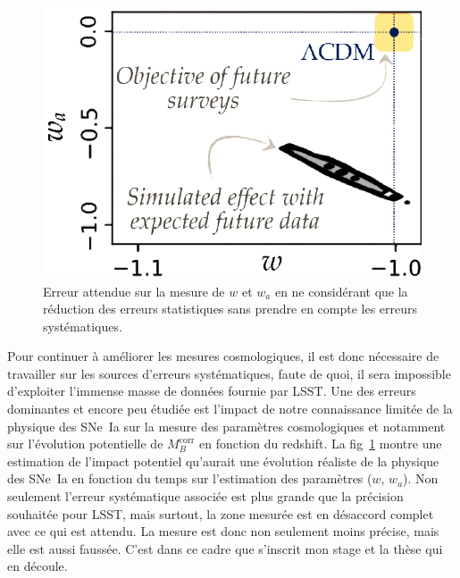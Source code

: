 \documentclass[a4paper, 12pt, svgnames]{article}
\begin{document}
\begin{figure}
    \vspace*{-20pt}
    \centering
    \includegraphics[width=1.\linewidth]{Rapport_figures/error.pdf}
    \captionsetup{justification=centering}
    \caption{Erreur attendue sur la mesure de $w$ et $w_a$ en ne considérant
    que la réduction des erreurs statistiques sans prendre en compte les erreurs
    systématiques.}
    \label{fig:err_syst}
\end{figure}

Pour continuer à améliorer les mesures cosmologiques, il est donc nécessaire de
travailler sur les sources d'erreurs systématiques, faute de quoi, il sera
impossible d'exploiter l'immense masse de données fournie par LSST. Une des
erreurs dominantes et encore peu étudiée est l'impact de notre connaissance
limitée de la physique des SNe~Ia sur la mesure des paramètres cosmologiques
\cite{rigault_strong_2018} et notamment sur l'évolution potentielle de
$M_B^{\mathrm{corr}}$ en fonction du redshift. La fig~\ref{fig:err_syst} montre
une estimation de l'impact potentiel qu'aurait une évolution réaliste de la
physique des SNe~Ia en fonction du temps sur l'estimation des paramètres ($w$,
$w_a$).  Non seulement l'erreur systématique associée est plus grande que la
précision souhaitée pour LSST, mais surtout, la zone mesurée est en désaccord
complet avec ce qui est attendu. La mesure est donc non seulement moins précise,
mais elle est aussi faussée. C'est dans ce cadre que s'inscrit mon stage et la
thèse qui en découle.

\end{document}
